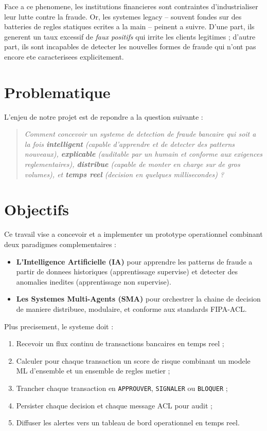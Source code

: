 \documentclass[12pt,a4paper,oneside]{report}
\begin{document}
Face a ce phenomene, les institutions financieres sont contraintes
d'industrialiser leur lutte contre la fraude. Or, les systemes legacy --
souvent fondes sur des batteries de regles statiques ecrites a la main --
peinent a suivre. D'une part, ils generent un taux excessif de
\emph{faux positifs} qui irrite les clients legitimes ; d'autre part, ils sont
incapables de detecter les nouvelles formes de fraude qui n'ont pas encore ete
caracterisees explicitement.

\section*{Problematique}

L'enjeu de notre projet est de repondre a la question suivante :

\begin{quote}
\itshape Comment concevoir un systeme de detection de fraude bancaire qui soit
a la fois \textbf{intelligent} (capable d'apprendre et de detecter des
patterns nouveaux), \textbf{explicable} (auditable par un humain et conforme
aux exigences reglementaires), \textbf{distribue} (capable de monter en charge
sur de gros volumes), et \textbf{temps reel} (decision en quelques
millisecondes) ?
\end{quote}

\section*{Objectifs}

Ce travail vise a concevoir et a implementer un prototype operationnel
combinant deux paradigmes complementaires :

\begin{itemize}[leftmargin=*]
  \item \textbf{L'Intelligence Artificielle (IA)} pour apprendre les patterns
        de fraude a partir de donnees historiques (apprentissage supervise) et
        detecter des anomalies inedites (apprentissage non supervise).
  \item \textbf{Les Systemes Multi-Agents (SMA)} pour orchestrer la chaine de
        decision de maniere distribuee, modulaire, et conforme aux standards
        FIPA-ACL.
\end{itemize}

Plus precisement, le systeme doit :
\begin{enumerate}[leftmargin=*]
  \item Recevoir un flux continu de transactions bancaires en temps reel ;
  \item Calculer pour chaque transaction un score de risque combinant un
        modele ML d'ensemble et un ensemble de regles metier ;
  \item Trancher chaque transaction en \texttt{APPROUVER}, \texttt{SIGNALER}
        ou \texttt{BLOQUER} ;
  \item Persister chaque decision et chaque message ACL pour audit ;
  \item Diffuser les alertes vers un tableau de bord operationnel en temps
        reel.
\end{enumerate}
\end{document}
